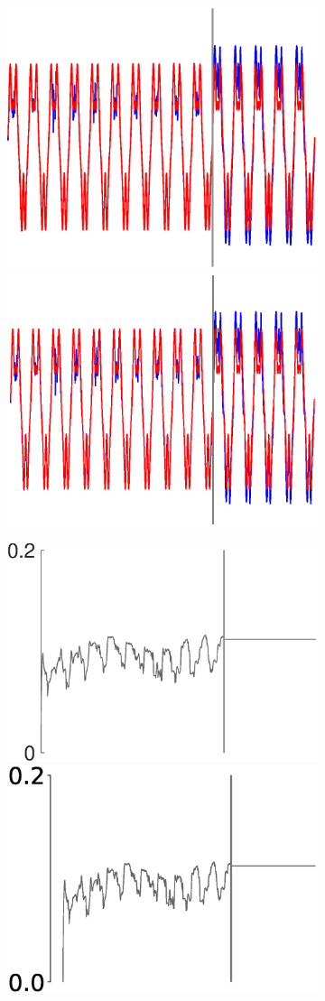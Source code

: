 \begin{figure}[h]
    
        \textbf{}\begin{subfigure}{\textwidth}
        \centering
        
        \includegraphics[trim=0cm 0cm 0cm 0cm,clip=true,height=0.1\linewidth,width=.45\linewidth]{Figures/Fig_T7/MATLAB/RMHL_T1_CoordinateY.eps}
        \includegraphics[trim=2cm 1cm 2cm 1cm,clip=true,height=0.1\linewidth,width=.45\linewidth]{Figures/Fig_T7/Python/RMHL_T1_Jmat_CoordinateY.eps}   
    
    \end{subfigure}
    
    
    \vspace{4em}
    
    \textbf{}\begin{subfigure}{\textwidth}
        \centering
        
        \hspace{.5em}
        \includegraphics[trim=0cm 0cm 0cm 0cm,clip=true,height=0.15\linewidth,width=.45\linewidth]{Figures/Fig_T7/MATLAB/RMHL_T1_W_norm.eps}
        \hspace{0em}
        \includegraphics[trim=0cm 0.5cm 2cm 0.5cm,clip=true,height=0.15\linewidth,width=.45\linewidth]{Figures/Fig_T7/Python/RMHL_T1_Jmat_W_norm.eps}
    
    \end{subfigure}
    
    
    \vspace{2em}
    
    \textbf{}\begin{subfigure}{\textwidth}
        \centering
        

\end{subfigure}
\end{figure}
